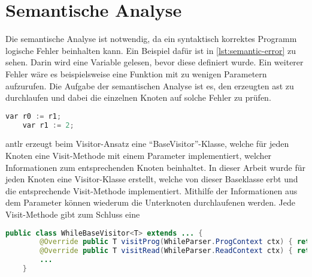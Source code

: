 \chapter{Semantische Analyse} \label{chap:semantic}

Die semantische Analyse ist notwendig, da ein syntaktisch korrektes Programm logische Fehler beinhalten kann. Ein Beispiel dafür ist in \cref{lst:semantic-error} zu sehen. Darin wird eine Variable gelesen, bevor diese definiert wurde. Ein weiterer Fehler wäre es beispielsweise eine Funktion mit zu wenigen Parametern aufzurufen. Die Aufgabe der semantischen Analyse ist es, den erzeugten \ac{ast} zu durchlaufen und dabei die einzelnen Knoten auf solche Fehler zu prüfen.

\begin{lstlisting}[language=c, caption=Inhalt der generierten BaseVisitor-Klasse, label={lst:semantic-error}]
	var r0 := r1;
	var r1 := 2;
\end{lstlisting}

\ac{antlr} erzeugt beim Visitor-Ansatz eine \enquote{BaseVisitor}-Klasse, welche für jeden Knoten eine Visit-Methode mit einem Parameter implementiert, welcher Informationen zum entsprechenden Knoten beinhaltet. In dieser Arbeit wurde für jeden Knoten eine Visitor-Klasse erstellt, welche von dieser Baseklasse erbt und die entsprechende Visit-Methode implementiert. Mithilfe der Informationen aus dem Parameter können wiederum die Unterknoten durchlaufenen werden. Jede Visit-Methode gibt zum Schluss eine 

\begin{lstlisting}[language=java, caption=Inhalt der generierten BaseVisitor-Klasse, label={lst:parser-basevisitor}]
	public class WhileBaseVisitor<T> extends ... {
		@Override public T visitProg(WhileParser.ProgContext ctx) { return visitChildren(ctx); }
		@Override public T visitRead(WhileParser.ReadContext ctx) { return visitChildren(ctx); }
		...
	}
\end{lstlisting}